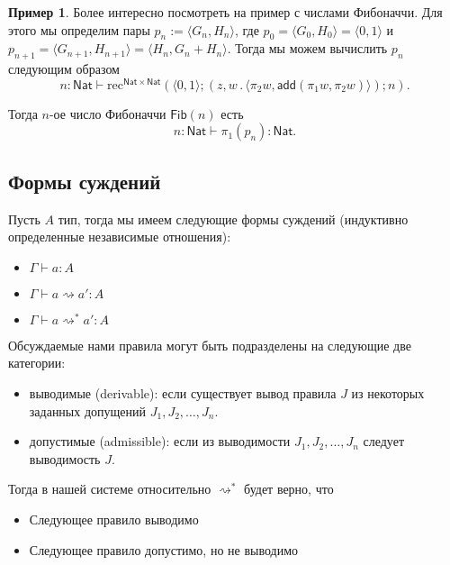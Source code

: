 \documentclass[openany]{book}
\theoremstyle{plain}
\theoremstyle{definition}
\newtheorem{eg}{Пример}[]
\newcommand{\rec}{\mathrm{rec}}
\newcommand{\nat}{\mathsf{Nat}}
\begin{document}
\begin{eg}
    Более интересно посмотреть на пример с числами Фибоначчи. Для этого мы определим пары \(p_n := \langle G_n, H_n \rangle\), где \(p_0 = \langle G_0, H_0 \rangle = \langle 0, 1 \rangle\) и \(p_{n+1} = \langle G_{n+1}, H_{n+1} \rangle = \langle H_n, G_n + H_n \rangle\). Тогда мы можем вычислить \(p_n\) следующим образом \[n : \nat \vdash \rec^{\nat \times \nat} (\langle 0, 1 \rangle; (z, w\,.\, \langle \pi_2 w, \mathsf{add}(\pi_1 w, \pi_2 w)\rangle); n).\]

    Тогда \(n\)-ое число Фибоначчи \(\mathsf{Fib}(n)\) есть \[n : \nat \vdash \pi_1(p_n) : \nat.\]
\end{eg}

\subsection{Формы суждений}

Пусть \(A\) тип, тогда мы имеем следующие формы суждений (индуктивно определенные независимые отношения):
\begin{itemize}
    \item \(\Gamma \vdash a:A\)
    \item \(\Gamma \vdash a \rightsquigarrow a':A\)
    \item \(\Gamma \vdash a \rightsquigarrow^* a':A\)
\end{itemize}

Обсуждаемые нами правила могут быть подразделены на следующие две категории:

\begin{itemize}
    \item выводимые (derivable): если существует вывод правила \(J\) из некоторых заданных допущений \(J_1, J_2, \dots, J_n\).
    \item допустимые (admissible): если из выводимости \(J_1, J_2, \dots, J_n\) следует выводимость \(J\).
\end{itemize}

Тогда в нашей системе относительно \(\rightsquigarrow^*\) будет верно, что
\begin{itemize}
    \item Следующее правило выводимо
        \begin{prooftree}
        \end{prooftree}

    \item Следующее правило допустимо, но не выводимо
        \begin{prooftree}
        \end{prooftree}
\end{itemize}
\end{document}
